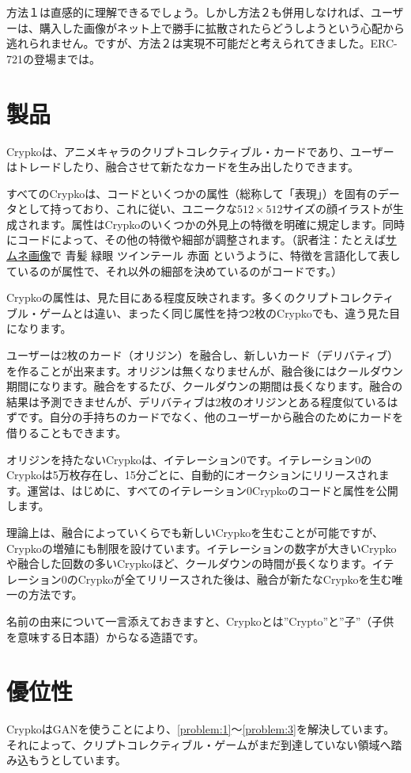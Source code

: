 \documentclass[a4paper]{article}
\begin{document}
方法１は直感的に理解できるでしょう。しかし方法２も併用しなければ、ユーザーは、購入した画像がネット上で勝手に拡散されたらどうしようという心配から逃れられません。ですが、方法２は実現不可能だと考えられてきました。ERC-721の登場までは。

\newpage

\section{製品}
Crypkoは、アニメキャラのクリプトコレクティブル・カードであり、ユーザーはトレードしたり、融合させて新たなカードを生み出したりできます。

すべてのCrypkoは、コードといくつかの属性（総称して「表現」）を固有のデータとして持っており、これに従い、ユニークな$512 \times 512$サイズの顔イラストが生成されます。属性はCrypkoのいくつかの外見上の特徴を明確に規定します。同時にコードによって、その他の特徴や細部が調整されます。（訳者注：たとえば\href{https://gorosuke.blue/2018/06/05/post-2669/#samne}{サムネ画像}で 青髪 緑眼 ツインテール 赤面 というように、特徴を言語化して表しているのが属性で、それ以外の細部を決めているのがコードです。）

Crypkoの属性は、見た目にある程度反映されます。多くのクリプトコレクティブル・ゲームとは違い、まったく同じ属性を持つ2枚のCrypkoでも、違う見た目になります。

ユーザーは2枚のカード（オリジン）を融合し、新しいカード（デリバティブ）を作ることが出来ます。オリジンは無くなりませんが、融合後にはクールダウン期間になります。融合をするたび、クールダウンの期間は長くなります。融合の結果は予測できませんが、デリバティブは2枚のオリジンとある程度似ているはずです。自分の手持ちのカードでなく、他のユーザーから融合のためにカードを借りることもできます。

オリジンを持たないCrypkoは、イテレーション0です。イテレーション0のCrypkoは5万枚存在し、15分ごとに、自動的にオークションにリリースされます。運営は、はじめに、すべてのイテレーション0Crypkoのコードと属性を公開します。

理論上は、融合によっていくらでも新しいCrypkoを生むことが可能ですが、Crypkoの増殖にも制限を設けています。イテレーションの数字が大きいCrypkoや融合した回数の多いCrypkoほど、クールダウンの時間が長くなります。イテレーション0のCrypkoが全てリリースされた後は、融合が新たなCrypkoを生む唯一の方法です。

名前の由来について一言添えておきますと、Crypkoとは”Crypto”と”子”（子供を意味する日本語）からなる造語です。

\section{優位性}
CrypkoはGANを使うことにより、\ref{problem:1}〜\ref{problem:3}を解決しています。それによって、クリプトコレクティブル・ゲームがまだ到達していない領域へ踏み込もうとしています。
\end{document}
